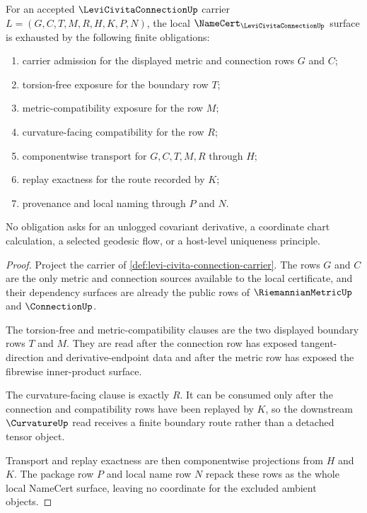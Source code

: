 \begin{theorem}
\label{thm:levi-civita-connection-namecert-obligations}
For an accepted $\LeviCivitaConnectionUp$ carrier $L=(G,C,T,M,R,H,K,P,N)$, the local $\NameCert_{\LeviCivitaConnectionUp}$ surface is exhausted by the following finite obligations:
\begin{enumerate}
\item carrier admission for the displayed metric and connection rows $G$ and $C$;
\item torsion-free exposure for the boundary row $T$;
\item metric-compatibility exposure for the row $M$;
\item curvature-facing compatibility for the row $R$;
\item componentwise transport for $G,C,T,M,R$ through $H$;
\item replay exactness for the route recorded by $K$;
\item provenance and local naming through $P$ and $N$.
\end{enumerate}
No obligation asks for an unlogged covariant derivative, a coordinate chart calculation, a selected geodesic flow, or a host-level uniqueness principle.
\end{theorem}
\begin{proof}
Project the carrier of \autoref{def:levi-civita-connection-carrier}. The rows $G$ and $C$ are the only metric and connection sources available to the local certificate, and their dependency surfaces are already the public rows of $\RiemannianMetricUp$ and $\ConnectionUp$.

The torsion-free and metric-compatibility clauses are the two displayed boundary rows $T$ and $M$. They are read after the connection row has exposed tangent-direction and derivative-endpoint data and after the metric row has exposed the fibrewise inner-product surface.

The curvature-facing clause is exactly $R$. It can be consumed only after the connection and compatibility rows have been replayed by $K$, so the downstream $\CurvatureUp$ read receives a finite boundary route rather than a detached tensor object.

Transport and replay exactness are then componentwise projections from $H$ and $K$. The package row $P$ and local name row $N$ repack these rows as the whole local NameCert surface, leaving no coordinate for the excluded ambient objects.
\end{proof}

